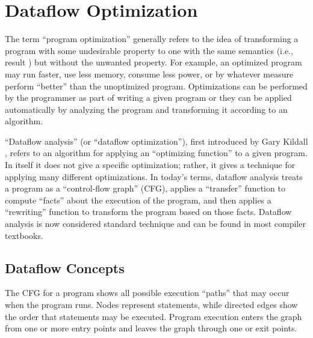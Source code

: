 \documentclass[12pt]{report}
\begin{document}


\renewcommand{\textfraction}{0.1}
\renewcommand{\topfraction}{0.9}

\chapter{Dataflow Optimization}
\label{ref_chapter_background}



The term ``program optimization'' generally refers to the idea of
transforming a program with some undesirable property to one with the
same semantics (i.e., result ) but without the unwanted property.  For
example, an optimized program may run faster, use less memory, consume
less power, or by whatever measure perform ``better'' than the
unoptimized program. Optimizations can be performed by the programmer
as part of writing a given program or they can be applied
automatically by analyzing the program and transforming it according
to an algorithm.

``Dataflow analysis'' (or ``dataflow optimization''), first introduced
by Gary Kildall \citep{Kildall1973}, refers to an algorithm for
applying an ``optimizing function'' to a given program. In itself it
does not give a specific optimization; rather, it gives a technique
for applying many different optimizations. In today's terms, dataflow
analysis treats a program as a ``control-flow graph'' (CFG), applies a
``transfer'' function to compute ``facts'' about the execution of the
program, and then applies a ``rewriting'' function to transform the
program based on those facts. Dataflow analysis is now considered
standard technique and can be found in most compiler textbooks.

\section{Dataflow Concepts}

The CFG for a program shows all possible execution ``paths'' that may
occur when the program runs. Nodes represent statements, while
directed edges show the order that statements may be executed.
Program execution enters the graph from one or more entry points and
leaves the graph through one or exit points.
\end{document}
